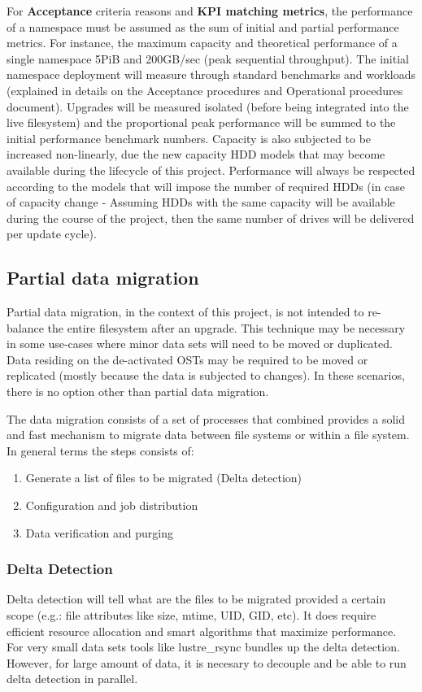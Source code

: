 \documentclass{article}
\begin{document}
For \textbf{Acceptance} criteria reasons and \textbf{KPI matching metrics}, the performance of a namespace must be assumed as the sum of initial and partial performance metrics. For instance, the maximum capacity and theoretical performance of a single namespace 5PiB and 200GB/sec (peak sequential throughput). The initial namespace deployment will measure through standard benchmarks and workloads (explained in details on the Acceptance procedures and Operational procedures document). Upgrades will be measured isolated (before being integrated into the live filesystem) and the proportional peak performance will be summed to the initial performance benchmark numbers. Capacity is also subjected to be increased non-linearly, due the new capacity HDD models that may become available during the lifecycle of this project. Performance will always be respected according to the models that will impose the number of required HDDs (in case of capacity change - Assuming HDDs with the same capacity will be available during the course of the project, then the same number of drives will be delivered per update cycle). 

\subsection{Partial data migration}
Partial data migration, in the context of this project, is not intended to re-balance the entire filesystem after an upgrade. This technique may be necessary in some use-cases where minor data sets will need to be moved or duplicated. Data residing on the de-activated OSTs may be required to be moved or replicated (mostly because the data is subjected to changes). In these scenarios, there is no option other than partial data migration.

The data migration consists of a set of processes that combined provides a solid and fast mechanism to migrate data between file systems or within a file system. In general terms the steps consists of:
\begin{enumerate}
    \item Generate a list of files to be migrated (Delta detection)
    \item Configuration and job distribution
    \item Data verification and purging
\end{enumerate}

\subsubsection{Delta Detection}
Delta detection will tell what are the files to be migrated provided a certain scope (e.g.: file attributes like size, mtime, UID, GID, etc). It does require efficient resource allocation and smart algorithms that maximize performance. For very small data sets tools like lustre\_rsync bundles up the delta detection. However, for large amount of data, it is necesary to decouple and be able to run delta detection in parallel. 
\end{document}
